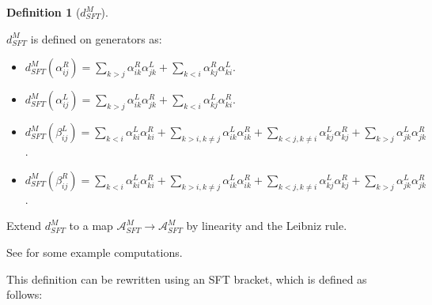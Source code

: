 \documentclass[a4paper,final, reqno]{amsart}
\theoremstyle{plain}
\theoremstyle{definition}
\newtheorem{Def}[Th]{Definition}
\newcommand{\A}{\mathcal{A}}
\begin{document}
	\begin{Def}[$d_{SFT}^M$] \label{def:dsftm} \-\
		
		$d_{SFT}^M$ is defined on generators as:
		
		\begin{itemize}
			\item $d_{SFT}^M(\alpha_{ij}^R) = \sum_{k>j} \alpha_{ik}^R \alpha_{jk}^L + \sum_{k<i} \alpha_{kj}^R \alpha_{ki}^L$.
			\item $d_{SFT}^M(\alpha_{ij}^L) = \sum_{k>j} \alpha_{ik}^L \alpha_{jk}^R + \sum_{k<i} \alpha_{kj}^L \alpha_{ki}^R$. 
			\item $d_{SFT}^M(\beta_{ij}^L) = \sum_{k<i} \alpha_{ki}^L\alpha_{ki}^R + \sum_{k>i, k\neq j} \alpha_{ik}^L\alpha_{ik}^R + \sum_{k<j, k\neq i} \alpha_{kj}^L\alpha_{kj}^R + \sum_{k>j} \alpha_{jk}^L\alpha_{jk}^R$.
			\item $d_{SFT}^M(\beta_{ij}^R) = \sum_{k<i} \alpha_{ki}^L\alpha_{ki}^R + \sum_{k>i, k\neq j} \alpha_{ik}^L\alpha_{ik}^R + \sum_{k<j, k\neq i} \alpha_{kj}^L\alpha_{kj}^R + \sum_{k>j} \alpha_{jk}^L\alpha_{jk}^R$.
		\end{itemize}
		
		Extend $d_{SFT}^M$ to a map $\A^M_{SFT}\to \A^M_{SFT}$ by linearity and the Leibniz rule.
	\end{Def}
	
	See  for some example computations.
	
	This definition can be rewritten using an SFT bracket, which is defined as follows:
	
\end{document}

